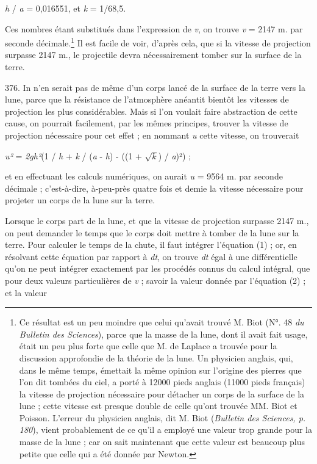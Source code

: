 \documentclass[a4paper, 11pt, oneside, polutonikogreek, french]{article}
\begin{document}
\begin{center}
\emph{h} / \emph{a} = 0,016551, et \emph{k} = 1/68,5.
\end{center}

Ces nombres étant substitués dans l'expression de \emph{v}, on trouve \emph{v} = 2147 m. par seconde décimale.\footnote{Ce résultat est un peu moindre que celui qu'avait trouvé M. Biot (N°. 48 \emph{du Bulletin des Sciences}), parce que la masse de la lune, dont il avait fait usage, était un peu plus forte que celle que M. de Laplace a trouvée pour la discussion approfondie de la théorie de la lune. Un physicien anglais, qui, dans le même temps, émettait la même opinion sur l'origine des pierres que l'on dit tombées du ciel, a porté à 12000 pieds anglais (11000 pieds français) la vitesse de projection nécessaire pour détacher un corps de la surface de la lune ; cette vitesse est presque double de celle qu'ont trouvée MM. Biot et Poisson. L'erreur du physicien anglais, dit M. Biot (\emph{Bulletin des Sciences, p. 180}), vient probablement de ce qu'il a employé une valeur trop grande pour la masse de la lune ; car on sait maintenant que cette valeur est beaucoup plus petite que celle qui a été donnée par Newton.} Il est facile de voir, d'après cela, que si la vitesse de projection surpasse 2147 m., le projectile devra nécessairement tomber sur la surface de la terre.

376. In n'en serait pas de même d'un corps lancé de la surface de la terre vers la lune, parce que la résistance de l'atmosphère anéantit bientôt les vitesses de projection les plus considérables. Mais si l'on voulait faire abstraction de cette cause, on pourrait facilement, par les mêmes principes, trouver la vitesse de projection nécessaire pour cet effet ; en nommant \emph{u} cette vitesse, on trouverait

\begin{center}
\emph{u²} = \emph{2gh²}(1 / \emph{h} + \emph{k} / (\emph{a} - \emph{h}) - ((1 + $\sqrt{k}$) / \emph{a})²) ;
\end{center}

et en effectuant les calculs numériques, on aurait \emph{u} = 9564 m. par seconde décimale ; c'est-à-dire, à-peu-près quatre fois et demie la vitesse nécessaire pour projeter un corps de la lune sur la terre.

Lorsque le corps part de la lune, et que la vitesse de projection surpasse 2147 m., on peut demander le temps que le corps doit mettre à tomber de la lune sur la terre. Pour calculer le temps de la chute, il faut intégrer l'équation (1) ; or, en résolvant cette équation par rapport à \emph{dt}, on trouve \emph{dt} égal à une différentielle qu'on ne peut intégrer exactement par les procédés connus du calcul intégral, que pour deux valeurs particulières de \emph{v} ; savoir la valeur donnée par l'équation (2) ; et la valeur
\end{document}
